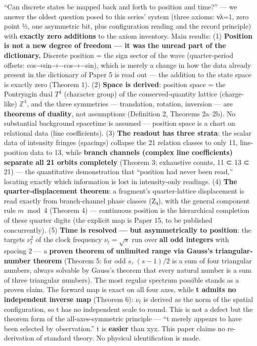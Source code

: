 \documentclass[
]{article}
\begin{document}
``Can discrete states be mapped back and forth to position and time?''
--- we answer the oldest question posed to this series' system (three
axioms: νλ=1, zero point ½, one asymmetric bit, plus configuration
reading and the record principle) with \textbf{exactly zero additions}
to the axiom inventory. Main results: (1) \textbf{Position is not a new
degree of freedom --- it was the unread part of the dictionary.}
Discrete position = the sign sector of the wave (quarter-period offsets:
cos→sin→−cos→−sin), which is merely a change in how the data already
present in the dictionary of Paper 5 is read out --- the addition to the
state space is exactly zero (Theorem 1). (2) \textbf{Space is derived}:
position space = the Pontryagin dual \(T^4\) (character group) of the
conserved-quantity lattice (charge-like) \(\mathbb{Z}^4\), and the three
symmetries --- translation, rotation, inversion --- are \textbf{theorems
of duality}, not assumptions (Definition 2, Theorems 2a--2b). No
substantial background spacetime is assumed --- position space is a
chart on relational data (line coefficients). (3) \textbf{The readout
has three strata}: the scalar data of intensity fringes (spacings)
collapse the 21 relation classes to only 11, line-position data to 13,
while \textbf{branch channels (complex line coefficients) separate all
21 orbits completely} (Theorem 3; exhaustive counts, 11 ⊂ 13 ⊂ 21) ---
the quantitative demonstration that ``position had never been read,''
locating exactly which information is lost in intensity-only readings.
(4) \textbf{The quarter-displacement theorem}: a fragment's
quarter-lattice displacement is read exactly from branch-channel phase
classes (Z₄), with the general component rule \(m\bmod4\) (Theorem 4)
--- continuous position is the hierarchical completion of these quarter
digits (the explicit map is Paper 15, to be published concurrently). (5)
\textbf{Time is resolved --- but asymmetrically to position}: the
targets \(\nu_t^2\) of the clock frequency \(\nu_t=\sqrt{s}\) run over
\textbf{all odd integers} with spacing 2 --- a \textbf{proven theorem of
unlimited range via Gauss's triangular-number theorem} (Theorem 5: for
odd \(s\), \((s-1)/2\) is a sum of four triangular numbers, always
solvable by Gauss's theorem that every natural number is a sum of three
triangular numbers). The most regular spectrum possible stands as a
proven claim. The forward map is exact on all four axes, while \textbf{t
admits no independent inverse map} (Theorem 6): \(\nu_t\) is derived as
the norm of the spatial configuration, so t has no independent scale to
round. This is not a defect but the theorem form of the
all-axes-symmetric principle --- ``t merely appears to have been
selected by observation.'' t is \textbf{easier} than xyz. This paper
claims no re-derivation of standard theory. No physical identification
is made.
\end{document}
